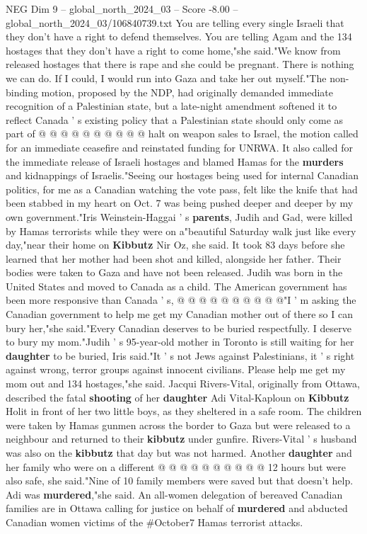 \begin{textsample}{NEG Dim 9 – global\_north\_2024\_03 – Score -8.00 – global\_north\_2024\_03/106840739.txt}
You are telling every single Israeli that they don't have a right to defend themselves.
You are telling Agam and the 134 hostages that they don't have a right to come home,"she said."We know from released hostages that there is rape and she could be pregnant.
There is nothing we can do.
If I could, I would run into Gaza and take her out myself."The non-binding motion, proposed by the NDP, had originally demanded immediate recognition of a Palestinian state, but a late-night amendment softened it to reflect Canada ' s existing policy that a Palestinian state should only come as part of @ @ @ @ @ @ @ @ @ @ halt on weapon sales to Israel, the motion called for an immediate ceasefire and reinstated funding for UNRWA.
It also called for the immediate release of Israeli hostages and blamed Hamas for the \textbf{murders} and kidnappings of Israelis."Seeing our hostages being used for internal Canadian politics, for me as a Canadian watching the vote pass, felt like the knife that had been stabbed in my heart on Oct. 7 was being pushed deeper and deeper by my own government."Iris Weinstein-Haggai ' s \textbf{parents}, Judih and Gad, were killed by Hamas terrorists while they were on a"beautiful Saturday walk just like every day,"near their home on \textbf{Kibbutz} Nir Oz, she said.
It took 83 days before she learned that her mother had been shot and killed, alongside her father.
Their bodies were taken to Gaza and have not been released.
Judih was born in the United States and moved to Canada as a child.
The American government has been more responsive than Canada ' s, @ @ @ @ @ @ @ @ @ @"I ' m asking the Canadian government to help me get my Canadian mother out of there so I can bury her,"she said."Every Canadian deserves to be buried respectfully.
I deserve to bury my mom."Judih ' s 95-year-old mother in Toronto is still waiting for her \textbf{daughter} to be buried, Iris said."It ' s not Jews against Palestinians, it ' s right against wrong, terror groups against innocent civilians.
Please help me get my mom out and 134 hostages,"she said.
Jacqui Rivers-Vital, originally from Ottawa, described the fatal \textbf{shooting} of her \textbf{daughter} Adi Vital-Kaploun on \textbf{Kibbutz} Holit in front of her two little boys, as they sheltered in a safe room.
The children were taken by Hamas gunmen across the border to Gaza but were released to a neighbour and returned to their \textbf{kibbutz} under gunfire.
Rivers-Vital ' s husband was also on the \textbf{kibbutz} that day but was not harmed.
Another \textbf{daughter} and her family who were on a different @ @ @ @ @ @ @ @ @ @ 12 hours but were also safe, she said."Nine of 10 family members were saved but that doesn't help.
Adi was \textbf{murdered},"she said.
An all-women delegation of bereaved Canadian families are in Ottawa calling for justice on behalf of \textbf{murdered} and abducted Canadian women victims of the \#October7 Hamas terrorist attacks.

\end{textsample}
